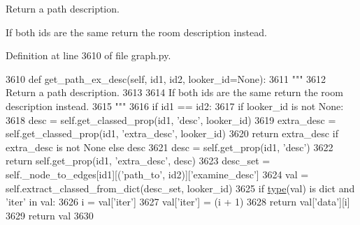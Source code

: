 \begin{DoxyVerb}Return a path description.

If both ids are the same return the room description instead.
\end{DoxyVerb}
 

Definition at line 3610 of file graph.\+py.


\begin{DoxyCode}
3610     \textcolor{keyword}{def }get\_path\_ex\_desc(self, id1, id2, looker\_id=None):
3611         \textcolor{stringliteral}{"""}
3612 \textcolor{stringliteral}{        Return a path description.}
3613 \textcolor{stringliteral}{}
3614 \textcolor{stringliteral}{        If both ids are the same return the room description instead.}
3615 \textcolor{stringliteral}{        """}
3616         \textcolor{keywordflow}{if} id1 == id2:
3617             \textcolor{keywordflow}{if} looker\_id \textcolor{keywordflow}{is} \textcolor{keywordflow}{not} \textcolor{keywordtype}{None}:
3618                 desc = self.get\_classed\_prop(id1, \textcolor{stringliteral}{'desc'}, looker\_id)
3619                 extra\_desc = self.get\_classed\_prop(id1, \textcolor{stringliteral}{'extra\_desc'}, looker\_id)
3620                 \textcolor{keywordflow}{return} extra\_desc \textcolor{keywordflow}{if} extra\_desc \textcolor{keywordflow}{is} \textcolor{keywordflow}{not} \textcolor{keywordtype}{None} \textcolor{keywordflow}{else} desc
3621             desc = self.get\_prop(id1, \textcolor{stringliteral}{'desc'})
3622             \textcolor{keywordflow}{return} self.get\_prop(id1, \textcolor{stringliteral}{'extra\_desc'}, desc)
3623         desc\_set = self.\_node\_to\_edges[id1][(\textcolor{stringliteral}{'path\_to'}, id2)][\textcolor{stringliteral}{'examine\_desc'}]
3624         val = self.extract\_classed\_from\_dict(desc\_set, looker\_id)
3625         \textcolor{keywordflow}{if} \hyperlink{namespaceparlai_1_1agents_1_1tfidf__retriever_1_1build__tfidf_ad5dfae268e23f506da084a9efb72f619}{type}(val) \textcolor{keywordflow}{is} dict \textcolor{keywordflow}{and} \textcolor{stringliteral}{'iter'} \textcolor{keywordflow}{in} val:
3626             i = val[\textcolor{stringliteral}{'iter'}]
3627             val[\textcolor{stringliteral}{'iter'}] = (i + 1) %
3628             \textcolor{keywordflow}{return} val[\textcolor{stringliteral}{'data'}][i]
3629         \textcolor{keywordflow}{return} val
3630 
\end{DoxyCode}
\mbox{\label{classlight__chats_1_1graph_1_1Graph_af857c9968c7787d742ac731d1cd7cb2c}} 
